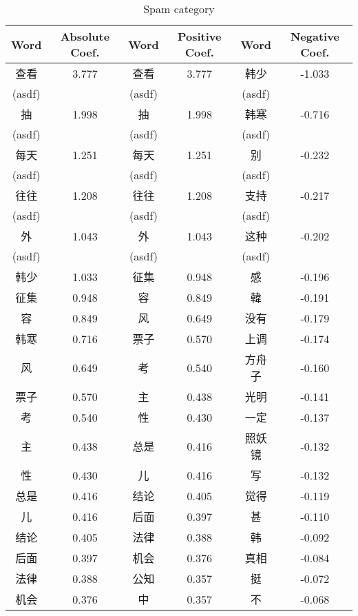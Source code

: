 \documentclass[11pt]{article}
\newcommand{\1}[1]{{\mathbf 1}\left\{#1\right\}}        %
\begin{document}
\begin{table}
\caption{Spam category}
\begin{center}
\begin{tabular}{|c|c||c|c||c|c|}
\hline
Word & Absolute Coef. & Word & Positive Coef. & Word & Negative Coef.\\ \hline
查看 & 3.777 & 查看 & 3.777 & 韩少 & -1.033\\
(asdf) & & (asdf) & & (asdf) & \\\hline
抽 & 1.998 & 抽 & 1.998 & 韩寒 & -0.716\\
(asdf) & & (asdf) & & (asdf) & \\\hline
每天 & 1.251 & 每天 & 1.251 & 别 & -0.232\\
(asdf) & & (asdf) & & (asdf) & \\\hline
往往 & 1.208 & 往往 & 1.208 & 支持 & -0.217\\
(asdf) & & (asdf) & & (asdf) & \\\hline
外 & 1.043 & 外 & 1.043 & 这种 & -0.202\\
(asdf) & & (asdf) & & (asdf) & \\\hline
韩少 & 1.033 & 征集 & 0.948 & 感 & -0.196\\ \hline
征集 & 0.948 & 容 & 0.849 & 韓 & -0.191\\ \hline
容 & 0.849 & 风 & 0.649 & 没有 & -0.179\\ \hline
韩寒 & 0.716 & 票子 & 0.570 & 上调 & -0.174\\ \hline
风 & 0.649 & 考 & 0.540 & 方舟子 & -0.160\\ \hline
票子 & 0.570 & 主 & 0.438 & 光明 & -0.141\\ \hline
考 & 0.540 & 性 & 0.430 & 一定 & -0.137\\ \hline
主 & 0.438 & 总是 & 0.416 & 照妖镜 & -0.132\\ \hline
性 & 0.430 & 儿 & 0.416 & 写 & -0.132\\ \hline
总是 & 0.416 & 结论 & 0.405 & 觉得 & -0.119\\ \hline
儿 & 0.416 & 后面 & 0.397 & 甚 & -0.110\\ \hline
结论 & 0.405 & 法律 & 0.388 & 韩 & -0.092\\ \hline
后面 & 0.397 & 机会 & 0.376 & 真相 & -0.084\\ \hline
法律 & 0.388 & 公知 & 0.357 & 挺 & -0.072\\ \hline
机会 & 0.376 & 中 & 0.357 & 不 & -0.068\\ \hline
\end{tabular}
\end{center}
\end{table}
\end{document}
